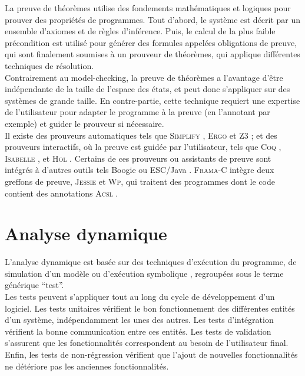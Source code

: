 La preuve de théorèmes utilise des fondements mathématiques et logiques
\cite{Hoare} pour prouver des propriétés de programmes. Tout d'abord, le système
est décrit par un ensemble d'axiomes et de règles d'inférence. Puis, le calcul
de la plus faible précondition \cite{Dijkstra} est utilisé pour générer des
formules appelées obligations de preuve, qui sont finalement soumises à un
prouveur de théorèmes, qui applique différentes techniques de résolution.\\

Contrairement au model-checking, la preuve de théorèmes a l'avantage d'être
indépendante de la taille de l'espace des états, et peut donc s'appliquer sur
des systèmes de grande taille. En contre-partie, cette technique requiert une
expertise de l'utilisateur pour adapter le programme à la preuve (en l'annotant
par exemple) et guider le prouveur si nécessaire.\\

Il existe des prouveurs automatiques tels que \textsc{Simplify}
\cite{Simplify}, \textsc{Ergo} \cite{Ergo} et \textsc{Z3} \cite{Z3}; et des
prouveurs interactifs, où la preuve est guidée par l'utilisateur, tels que
\textsc{Coq} \cite{Coq}, \textsc{Isabelle} \cite{Isabelle}, et \textsc{Hol}
\cite{HOL}. Certains de ces prouveurs ou assistants de preuve sont intégrés à
d'autres outils tels Boogie \cite{Boogie} ou ESC/Java \cite{ESC/Java}.
\textsc{Frama-C} intègre deux greffons de preuve, \textsc{Jessie} et
\textsc{Wp}, qui traitent des programmes dont le code contient des annotations
\textsc{Acsl} \cite{ACSL}.



\section{Analyse dynamique}
\label{sec:AD}

L’analyse dynamique est basée sur des techniques d’exécution du programme, de
simulation \cite{simulation} d’un modèle ou d'exécution symbolique
\cite{symbolic-execution}, regroupées sous le terme générique ``test''.\\

Les tests peuvent s’appliquer tout au long du cycle de développement d’un
logiciel. Les tests unitaires vérifient le bon fonctionnement des différentes
entités d’un système, indépendamment les unes des autres. Les tests
d'intégration vérifient la bonne communication entre ces entités. Les tests de
validation s'assurent que les fonctionnalités correspondent au besoin de
l’utilisateur final. Enfin, les tests de non-régression vérifient que l'ajout de
nouvelles fonctionnalités ne détériore pas les anciennes fonctionnalités.\\

